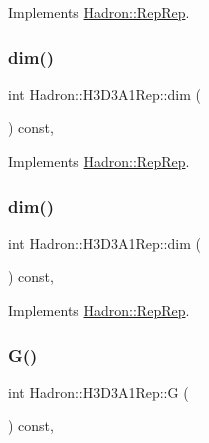 Implements \mbox{\hyperlink{structHadron_1_1RepRep_a92c8802e5ed7afd7da43ccfd5b7cd92b}{Hadron\+::\+Rep\+Rep}}.

\mbox{\label{structHadron_1_1H3D3A1Rep_ac7d5289dfab1007d156e2eef2b159026}} 
\subsubsection{\texorpdfstring{dim()}{dim()}\hspace{0.1cm}{\footnotesize\ttfamily [2/3]}}
{\footnotesize\ttfamily int Hadron\+::\+H3\+D3\+A1\+Rep\+::dim (\begin{DoxyParamCaption}{ }\end{DoxyParamCaption}) const\hspace{0.3cm}{\ttfamily [inline]}, {\ttfamily [virtual]}}



Implements \mbox{\hyperlink{structHadron_1_1RepRep_a92c8802e5ed7afd7da43ccfd5b7cd92b}{Hadron\+::\+Rep\+Rep}}.

\mbox{\label{structHadron_1_1H3D3A1Rep_ac7d5289dfab1007d156e2eef2b159026}} 
\subsubsection{\texorpdfstring{dim()}{dim()}\hspace{0.1cm}{\footnotesize\ttfamily [3/3]}}
{\footnotesize\ttfamily int Hadron\+::\+H3\+D3\+A1\+Rep\+::dim (\begin{DoxyParamCaption}{ }\end{DoxyParamCaption}) const\hspace{0.3cm}{\ttfamily [inline]}, {\ttfamily [virtual]}}



Implements \mbox{\hyperlink{structHadron_1_1RepRep_a92c8802e5ed7afd7da43ccfd5b7cd92b}{Hadron\+::\+Rep\+Rep}}.

\mbox{\label{structHadron_1_1H3D3A1Rep_acc86f1e291571190123adf57dc635290}} 
\subsubsection{\texorpdfstring{G()}{G()}\hspace{0.1cm}{\footnotesize\ttfamily [1/2]}}
{\footnotesize\ttfamily int Hadron\+::\+H3\+D3\+A1\+Rep\+::G (\begin{DoxyParamCaption}{ }\end{DoxyParamCaption}) const\hspace{0.3cm}{\ttfamily [inline]}, {\ttfamily [virtual]}}


